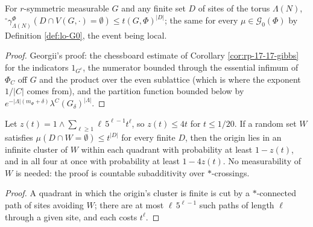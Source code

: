 \begin{lemma}
    \label{lem:lo-18-10}
    \leanok

    For $r$-symmetric measurable $G$ and any finite set $D$ of sites of the torus $\Lambda(N)$,
    ${}^\circ\gamma_{\Lambda(N)}^\Phi(D \cap V(G,\cdot) = \emptyset) \leq t(G,\Phi)^{|D|}$;
    the same for every $\mu \in \mathcal G_0(\Phi)$ by Definition \ref{def:lo-G0}, the event
    being local.
\end{lemma}
\begin{proof}
    \leanok
    Georgii's proof: the chessboard estimate of Corollary \ref{cor:rp-17-17-gibbs} for the
    indicators $1_{G^c}$, the numerator bounded through the essential infimum of $\Phi_C$ off $G$
    and the product over the even sublattice (which is where the exponent $1/|C|$ comes from), and
    the partition function bounded below by $e^{-|\Lambda|(m_\Phi+\delta)}\lambda^C(G_\delta)^{|\Lambda|}$.
\end{proof}

\begin{lemma}[Georgii (18.13), (18.14)]
    \label{lem:lo-18-14}
    \leanok

    Let $z(t) = 1 \wedge \sum_{\ell \geq 1}\ell\,5^{\ell-1}t^\ell$, so $z(t) \leq 4t$ for
    $t \leq 1/20$. If a random set $W$ satisfies $\mu(D \cap W = \emptyset) \leq t^{|D|}$ for every
    finite $D$, then the origin lies in an infinite cluster of $W$ within each quadrant with
    probability at least $1 - z(t)$, and in all four at once with probability at least $1 - 4z(t)$.
    No measurability of $W$ is needed: the proof is countable subadditivity over $*$-crossings.
\end{lemma}
\begin{proof}
    \leanok
    A quadrant in which the origin's cluster is finite is cut by a $*$-connected path of sites
    avoiding $W$; there are at most $\ell\,5^{\ell-1}$ such paths of length $\ell$ through a given
    site, and each costs $t^\ell$.
\end{proof}


